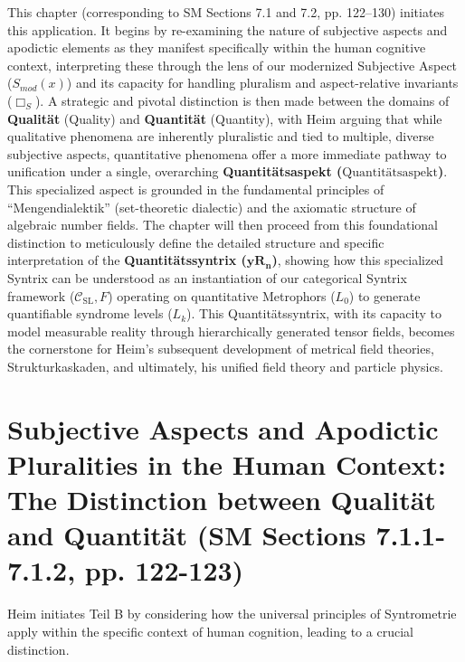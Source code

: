 \documentclass[
    12pt,              %
    a4paper,           %
    headings=normal,   %
    twoside=true,      %
    BCOR=8mm,          %
]{scrbook}
\newcommand{\q}[1]{\enquote{#1}}
\newcommand{\quantitaetsaspekt}{\text{Quantitätsaspekt}}
\newcommand{\quantitaetssyntrix}{\bm{yR_n}}
\newcommand{\BoxS}{\Box_S}
\begin{document}
This chapter (corresponding to SM Sections 7.1 and 7.2, pp. 122–130) initiates this application. It begins by re-examining the nature of subjective aspects and apodictic elements as they manifest specifically within the human cognitive context, interpreting these through the lens of our modernized Subjective Aspect (\(S_{mod}(x)\)) and its capacity for handling pluralism and aspect-relative invariants (\(\BoxS\)). A strategic and pivotal distinction is then made between the domains of \textbf{Qualität} (Quality) and \textbf{Quantität} (Quantity), with Heim arguing that while qualitative phenomena are inherently pluralistic and tied to multiple, diverse subjective aspects, quantitative phenomena offer a more immediate pathway to unification under a single, overarching \textbf{Quantitätsaspekt (\(\quantitaetsaspekt\))}. This specialized aspect is grounded in the fundamental principles of \q{Mengendialektik} (set-theoretic dialectic) and the axiomatic structure of algebraic number fields. The chapter will then proceed from this foundational distinction to meticulously define the detailed structure and specific interpretation of the \textbf{Quantitätssyntrix (\(\quantitaetssyntrix\))}, showing how this specialized Syntrix can be understood as an instantiation of our categorical Syntrix framework (\(\mathcal{C}_{\text{SL}}, F\)) operating on quantitative Metrophors (\(L_0\)) to generate quantifiable syndrome levels (\(L_k\)). This Quantitätssyntrix, with its capacity to model measurable reality through hierarchically generated tensor fields, becomes the cornerstone for Heim's subsequent development of metrical field theories, Strukturkaskaden, and ultimately, his unified field theory and particle physics.

\section{Subjective Aspects and Apodictic Pluralities in the Human Context: The Distinction between Qualität and Quantität (SM Sections 7.1.1-7.1.2, pp. 122-123)}
\label{sec:ch7_1_qualitaet_quantitaet}

Heim initiates Teil B by considering how the universal principles of Syntrometrie apply within the specific context of human cognition, leading to a crucial distinction.
\end{document}
